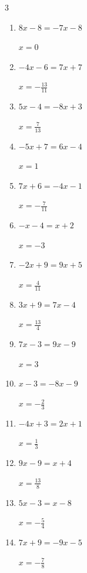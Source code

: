 \begin{multicols}{3}
\begin{enumerate}
        $\displaystyle x=\frac{5}{2}$

  \item $8x-8=-7x-8$

        $\displaystyle x=0$

  \item $-4x-6=7x+7$

        $\displaystyle x=-\frac{13}{11}$

  \item $5x-4=-8x+3$

        $\displaystyle x=\frac{7}{13}$

\columnbreak %

  \item $-5x+7=6x-4$

        $\displaystyle x=1$

  \item $7x+6=-4x-1$

        $\displaystyle x=-\frac{7}{11}$

  \item $-x-4=x+2$

        $\displaystyle x=-3$

  \item $-2x+9=9x+5$

        $\displaystyle x=\frac{4}{11}$

  \item $3x+9=7x-4$

        $\displaystyle x=\frac{13}{4}$

  \item $7x-3=9x-9$

        $\displaystyle x=3$

  \item $x-3=-8x-9$

        $\displaystyle x=-\frac{2}{3}$

  \item $-4x+3=2x+1$

        $\displaystyle x=\frac{1}{3}$

  \item $9x-9=x+4$

        $\displaystyle x=\frac{13}{8}$

  \item $5x-3=x-8$

        $\displaystyle x=-\frac{5}{4}$

  \item $7x+9=-9x-5$

        $\displaystyle x=-\frac{7}{8}$


\end{enumerate}
\end{multicols}
